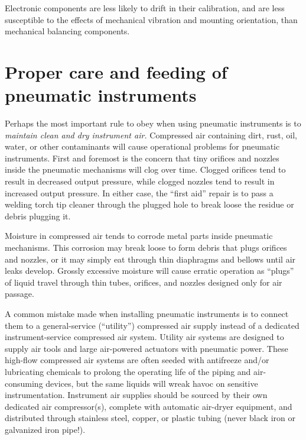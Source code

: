 Electronic components are less likely to drift in their calibration, and are less susceptible to the effects of mechanical vibration and mounting orientation, than mechanical balancing components.









\filbreak
\section{Proper care and feeding of pneumatic instruments} 

Perhaps the most important rule to obey when using pneumatic instruments is to \textit{maintain clean and dry instrument air.}  Compressed air containing dirt, rust, oil, water, or other contaminants will cause operational problems for pneumatic instruments.  First and foremost is the concern that tiny orifices and nozzles inside the pneumatic mechanisms will clog over time.  Clogged orifices tend to result in decreased output pressure, while clogged nozzles tend to result in increased output pressure.  In either case, the ``first aid'' repair is to pass a welding torch tip cleaner through the plugged hole to break loose the residue or debris plugging it.

Moisture in compressed air tends to corrode metal parts inside pneumatic mechanisms.  This corrosion may break loose to form debris that plugs orifices and nozzles, or it may simply eat through thin diaphragms and bellows until air leaks develop.  Grossly excessive moisture will cause erratic operation as ``plugs'' of liquid travel through thin tubes, orifices, and nozzles designed only for air passage.

A common mistake made when installing pneumatic instruments is to connect them to a general-service (``utility'') compressed air supply instead of a dedicated instrument-service compressed air system.  Utility air systems are designed to supply air tools and large air-powered actuators with pneumatic power.  These high-flow compressed air systems are often seeded with antifreeze and/or lubricating chemicals to prolong the operating life of the piping and air-consuming devices, but the same liquids will wreak havoc on sensitive instrumentation.  Instrument air supplies should be sourced by their own dedicated air compressor(s), complete with automatic air-dryer equipment, and distributed through stainless steel, copper, or plastic tubing (never black iron or galvanized iron pipe!).

